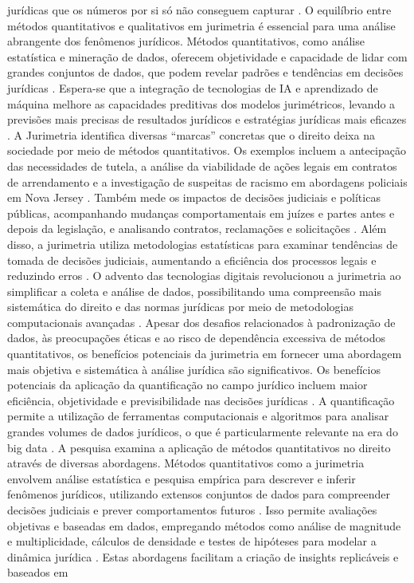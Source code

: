 \begin{agradecimentos}
jurídicas que os números por si só não conseguem capturar \cite{10.1590/dados.2022.65.3.267,10.1057/s41599-020-0396-5}. O equilíbrio entre métodos quantitativos e qualitativos em jurimetria é essencial para uma análise abrangente dos fenômenos jurídicos. Métodos quantitativos, como análise estatística e mineração de dados, oferecem objetividade e capacidade de lidar com grandes conjuntos de dados, que podem revelar padrões e tendências em decisões jurídicas \cite{10.1177/0094306118767649,de2010jurimetrics}. Espera-se que a integração de tecnologias de IA e aprendizado de máquina melhore as capacidades preditivas dos modelos jurimétricos, levando a previsões mais precisas de resultados jurídicos e estratégias jurídicas mais eficazes \cite{10.1007/s11186-021-09453-1,10.5040/9781350220645}. A Jurimetria identifica diversas “marcas” concretas que o direito deixa na sociedade por meio de métodos quantitativos. Os exemplos incluem a antecipação das necessidades de tutela, a análise da viabilidade de ações legais em contratos de arrendamento e a investigação de suspeitas de racismo em abordagens policiais em Nova Jersey \cite{zabala1809}. Também mede os impactos de decisões judiciais e políticas públicas, acompanhando mudanças comportamentais em juízes e partes antes e depois da legislação, e analisando contratos, reclamações e solicitações \cite{nunes2018}. Além disso, a jurimetria utiliza metodologias estatísticas para examinar tendências de tomada de decisões judiciais, aumentando a eficiência dos processos legais e reduzindo erros \cite{massuanganhe2016, nunes2018}. O advento das tecnologias digitais revolucionou a jurimetria ao simplificar a coleta e análise de dados, possibilitando uma compreensão mais sistemática do direito e das normas jurídicas por meio de metodologias computacionais avançadas \cite{10.1007/s11186-021-09453-1,unger2021process}. Apesar dos desafios relacionados à padronização de dados, às preocupações éticas e ao risco de dependência excessiva de métodos quantitativos, os benefícios potenciais da jurimetria em fornecer uma abordagem mais objetiva e sistemática à análise jurídica são \cite{desafios jurimétricos} significativos. Os benefícios potenciais da aplicação da quantificação no campo jurídico incluem maior eficiência, objetividade e previsibilidade nas decisões jurídicas \cite{silva2023role,nunes2016jurimetria}. A quantificação permite a utilização de ferramentas computacionais e algoritmos para analisar grandes volumes de dados jurídicos, o que é particularmente relevante na era do big data \cite{silva2023role,nunes2016jurimetria}. A pesquisa examina a aplicação de métodos quantitativos no direito através de diversas abordagens. Métodos quantitativos como a jurimetria envolvem análise estatística e pesquisa empírica para descrever e inferir fenômenos jurídicos, utilizando extensos conjuntos de dados para compreender decisões judiciais e prever comportamentos futuros \cite{colombo2017, luvizotto2020, nunes2018, massuanganhe2016}. Isso permite avaliações objetivas e baseadas em dados, empregando métodos como análise de magnitude e multiplicidade, cálculos de densidade e testes de hipóteses para modelar a dinâmica jurídica \cite{nunes2018, nunes2018}. Estas abordagens facilitam a criação de insights replicáveis e baseados em 
\end{agradecimentos}
